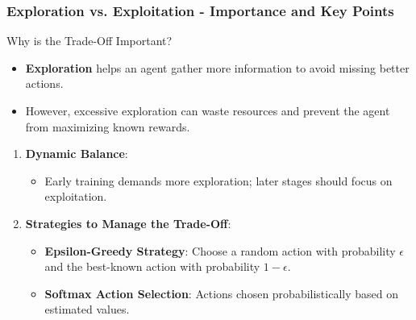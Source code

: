 \documentclass[aspectratio=169]{beamer}
\begin{document}
\begin{frame}[fragile]
    \frametitle{Exploration vs. Exploitation - Importance and Key Points}
    \begin{block}{Why is the Trade-Off Important?}
        \begin{itemize}
            \item \textbf{Exploration} helps an agent gather more information to avoid missing better actions. 
            \item However, excessive exploration can waste resources and prevent the agent from maximizing known rewards.
        \end{itemize}
    \end{block}
    \begin{enumerate}
        \item \textbf{Dynamic Balance}: 
            \begin{itemize}
                \item Early training demands more exploration; later stages should focus on exploitation.
            \end{itemize}
        \item \textbf{Strategies to Manage the Trade-Off}:
            \begin{itemize}
                \item \textbf{Epsilon-Greedy Strategy}: 
                Choose a random action with probability $\epsilon$ and the best-known action with probability $1 - \epsilon$.
                \item \textbf{Softmax Action Selection}:
                Actions chosen probabilistically based on estimated values.
            \end{itemize}
    \end{enumerate}
\end{frame}
\end{document}
